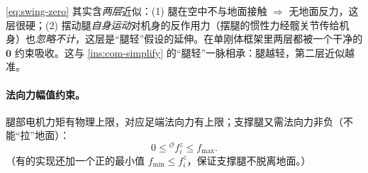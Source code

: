 \begin{insight}[摆动腿零力约束的双层近似]\label{ins:swing-zero}
\cref{eq:swing-zero} 其实含\emph{两层}近似：(1) 腿在空中不与地面接触 $\Rightarrow$ 无地面反力，这层很硬；(2) 摆动腿\emph{自身运动}对机身的反作用力（摆腿的惯性力经髋关节传给机身）也\emph{忽略不计}，这层是“腿轻”假设的延伸。在单刚体框架里两层都被一个干净的 $\mathbf{0}$ 约束吸收。这与 \cref{ins:com-simplify} 的“腿轻”一脉相承：腿越轻，第二层近似越准。
\end{insight}

\paragraph{ 法向力幅值约束。}
腿部电机力矩有物理上限，对应足端法向力有上限；支撑腿又需法向力非负（不能“拉”地面）\cite{dicarlo2018cheetah,yu2021quadruped}：
\begin{equation}
  0\le{}^{\mathcal{O}}f_i^{z}\le f_{\max}.
  \label{eq:normal-bound}
\end{equation}
（有的实现还加一个正的最小值 $f_{\min}\le f_i^z$，保证支撑腿不脱离地面。）


